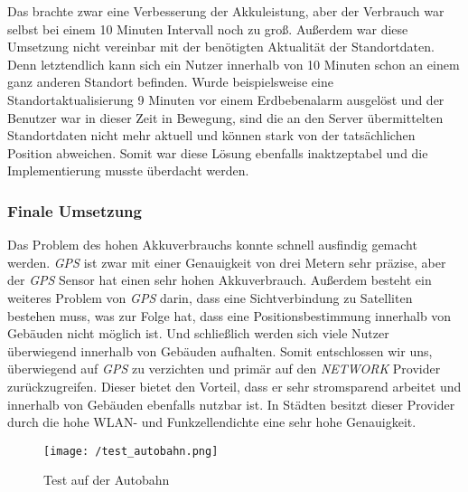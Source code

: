 Das brachte zwar eine Verbesserung der Akkuleistung, aber der Verbrauch war selbst bei einem 10 Minuten Intervall noch zu groß. Außerdem war diese Umsetzung nicht vereinbar mit der benötigten Aktualität der Standortdaten. Denn letztendlich kann sich ein Nutzer innerhalb von 10 Minuten schon an einem ganz anderen Standort befinden. Wurde beispielsweise eine Standortaktualisierung 9 Minuten vor einem Erdbebenalarm ausgelöst und der Benutzer war in dieser Zeit in Bewegung, sind die an den Server übermittelten Standortdaten nicht mehr aktuell und können stark von der tatsächlichen Position abweichen. Somit war diese Lösung ebenfalls inaktzeptabel und die Implementierung musste überdacht werden.

\subsubsection{Finale Umsetzung}
Das Problem des hohen Akkuverbrauchs konnte schnell ausfindig gemacht werden. \textit{GPS} ist zwar mit einer Genauigkeit von drei Metern sehr präzise, aber der \textit{GPS} Sensor hat einen sehr hohen Akkuverbrauch. Außerdem besteht ein weiteres Problem von \textit{GPS} darin, dass eine Sichtverbindung zu Satelliten bestehen muss, was zur Folge hat, dass eine Positionsbestimmung innerhalb von Gebäuden nicht möglich ist. Und schließlich werden sich viele Nutzer überwiegend innerhalb von Gebäuden aufhalten.
Somit entschlossen wir uns, überwiegend auf \textit{GPS} zu verzichten und primär auf den \textit{NETWORK} Provider zurückzugreifen. Dieser bietet den Vorteil, dass er sehr stromsparend arbeitet und innerhalb von Gebäuden ebenfalls nutzbar ist. In Städten besitzt dieser Provider durch die hohe WLAN- und Funkzellendichte eine sehr hohe Genauigkeit. 
\begin{wrapfigure}{r}{60mm}
\centering
   \texttt{[image: /test\_autobahn.png]} 
   \caption[Lokalisierung: Test auf der Autobahn]{Test auf der Autobahn}
\end{wrapfigure}
